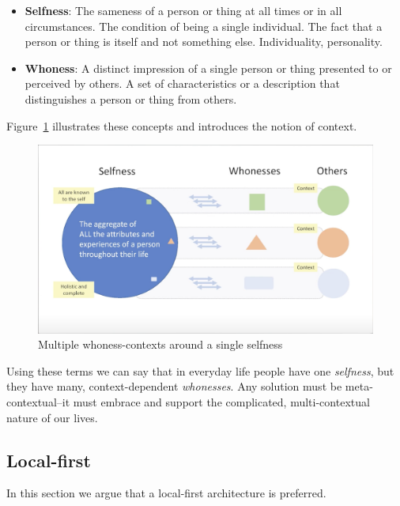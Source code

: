 \documentclass[11pt, oneside]{article}   	%
\begin{document}
\begin{itemize}
\item \textbf{Selfness}: The sameness of a person or thing at all times or in all circumstances. The condition of being a single individual. The fact that a person or thing is itself and not something else. Individuality, personality. 
\item \textbf{Whoness}: A distinct impression of a single person or thing presented to or perceived by others. A set of characteristics or a description that distinguishes a person or thing from others. 
\end{itemize}

Figure~\ref{fig:multiple-contexts} illustrates these concepts and introduces the notion of context.

\begin{figure}[htbp]
\includegraphics[width=\textwidth]{./images/selfness-and-whoness-larger.png}
\caption{Multiple whoness-contexts around a single selfness}
\label{fig:multiple-contexts}
\end{figure}

Using these terms we can say that in everyday life people have one \emph{selfness}, but they have many, context-dependent \emph{whonesses}. Any solution must be meta-contextual--it must embrace and support the complicated, multi-contextual nature of our lives.

\subsection{Local-first}

In this section we argue that a local-first architecture is preferred. 
\end{document}
